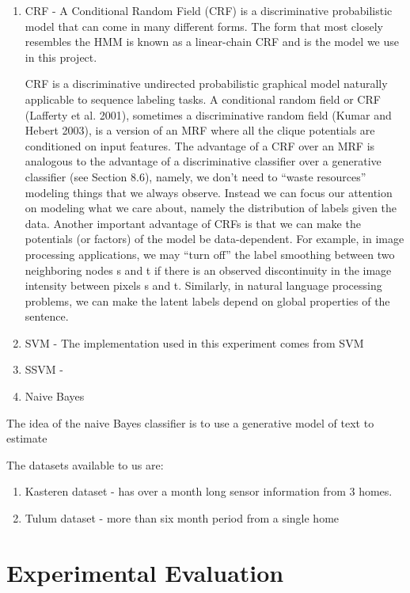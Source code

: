 \documentclass[11pt, oneside]{article}   	%
\begin{document}
\begin{enumerate}
\item CRF - 
A Conditional Random Field (CRF) is a discriminative probabilistic model that can come in many different forms. The form that most closely resembles the HMM is known as a linear-chain CRF and is the model we use in this project.

CRF is a discriminative undirected probabilistic graphical model naturally applicable to sequence labeling tasks. A conditional random field or CRF (Lafferty et al. 2001), sometimes a discriminative random field (Kumar and Hebert 2003), is  a version of an MRF where all the clique potentials are conditioned on input features. The advantage of a CRF over an MRF is analogous to the advantage of a discriminative classifier over a generative classifier (see Section 8.6), namely, we don’t need to “waste resources” modeling things that we always observe. Instead we can focus our attention on modeling what we care about, namely the distribution of labels given the data.
Another important advantage of CRFs is that we can make the potentials (or factors) of the model be data-dependent. For example, in image processing applications, we may “turn off” the label smoothing between two neighboring nodes s and t if there is an observed discontinuity in the image intensity between pixels s and t. Similarly, in natural language processing problems, we can make the latent labels depend on global properties of the sentence. 

\item SVM - 
The implementation used in this experiment comes from SVM

\item SSVM - 

\item Naive Bayes
	\end{enumerate}
The idea of the naive Bayes classifier is to use a generative model of text to estimate


The datasets available to us are:
	\begin{enumerate}
\item Kasteren dataset - has over a month long sensor information from 3 homes.
\item Tulum dataset - more than six month period from a single home
	\end{enumerate}


\section{Experimental Evaluation}
\end{document}
